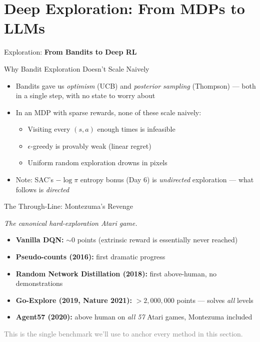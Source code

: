 \section{Deep Exploration: From MDPs to LLMs}

\begin{frame}{}
    \LARGE Exploration: \textbf{From Bandits to Deep RL}
\end{frame}

\begin{frame}{Why Bandit Exploration Doesn't Scale Naively}
\begin{itemize}
    \setlength{\itemsep}{0.55em}
    \item Bandits gave us \emph{optimism} (UCB) and \emph{posterior sampling} (Thompson) --- both in a single step, with no state to worry about
    \item In an MDP with sparse rewards, none of these scale naively:
    \begin{itemize}
        \item Visiting every $(s,a)$ enough times is infeasible
        \item $\epsilon$-greedy is provably weak (linear regret)
        \item Uniform random exploration drowns in pixels
    \end{itemize}
    \item Note: SAC's $-\log\pi$ entropy bonus (Day 6) is \emph{undirected} exploration --- what follows is \emph{directed}
\end{itemize}
\end{frame}

\begin{frame}{The Through-Line: Montezuma's Revenge}
\begin{center}
\textit{The canonical hard-exploration Atari game.}
\end{center}
\vspace{0.6em}
\begin{itemize}
    \setlength{\itemsep}{0.45em}
    \item \textbf{Vanilla DQN:} $\sim 0$ points (extrinsic reward is essentially never reached)
    \item \textbf{Pseudo-counts (2016):} first dramatic progress
    \item \textbf{Random Network Distillation (2018):} first above-human, no demonstrations
    \item \textbf{Go-Explore (2019, Nature 2021):} $>2{,}000{,}000$ points --- solves \emph{all} levels
    \item \textbf{Agent57 (2020):} above human on \emph{all 57} Atari games, Montezuma included
\end{itemize}
\vspace{0.5em}
\centering\small\textcolor{gray}{This is the single benchmark we'll use to anchor every method in this section.}
\end{frame}

